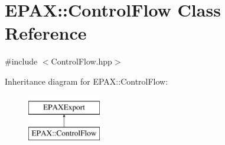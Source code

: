 \hypertarget{class_e_p_a_x_1_1_control_flow}{\section{\-E\-P\-A\-X\-:\-:\-Control\-Flow \-Class \-Reference}
\label{class_e_p_a_x_1_1_control_flow}
}


{\ttfamily \#include $<$\-Control\-Flow.\-hpp$>$}

\-Inheritance diagram for \-E\-P\-A\-X\-:\-:\-Control\-Flow\-:\begin{figure}[H]
\begin{center}
\leavevmode
\includegraphics[height=2.000000cm]{class_e_p_a_x_1_1_control_flow}
\end{center}
\end{figure}
